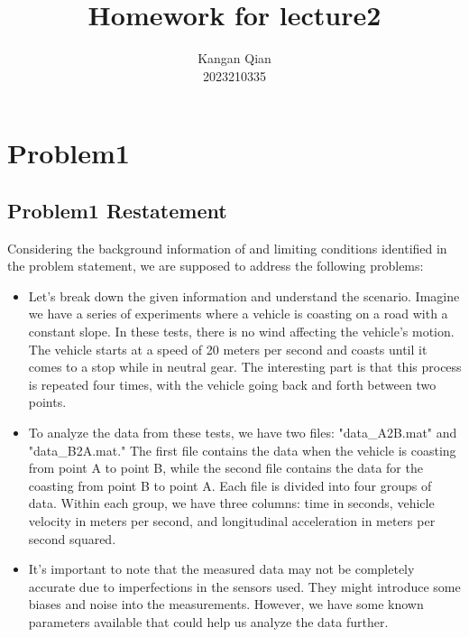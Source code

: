\documentclass[UTF8,a4paper,11pt]{article}
\title{\textbf{\huge{Homework for lecture2}}}
\author{Kangan Qian
\\2023210335}
\date{} %
\begin{document}
\newcommand{\supercite}[1]{\textsuperscript{\cite{#1}}}
\maketitle
\setlength{\oddsidemargin}{ 1cm} %
\setlength{\evensidemargin}{\oddsidemargin}
\setlength{\textwidth}{13.50cm}
\vspace{-0.2cm}

\section{Problem1}
\subsection{Problem1 Restatement}
Considering the background information of and limiting conditions identified in the problem statement, we are supposed to address the following problems:
\begin{itemize}
\item Let's break down the given information and understand the scenario. Imagine we have a series of experiments where a vehicle is coasting on a road with a constant slope. In these tests, there is no wind affecting the vehicle's motion. The vehicle starts at a speed of 20 meters per second and coasts until it comes to a stop while in neutral gear. The interesting part is that this process is repeated four times, with the vehicle going back and forth between two points.
\item
To analyze the data from these tests, we have two files: "data\_A2B.mat" and "data\_B2A.mat." The first file contains the data when the vehicle is coasting from point A to point B, while the second file contains the data for the coasting from point B to point A. Each file is divided into four groups of data. Within each group, we have three columns: time in seconds, vehicle velocity in meters per second, and longitudinal acceleration in meters per second squared.
\item
It's important to note that the measured data may not be completely accurate due to imperfections in the sensors used. They might introduce some biases and noise into the measurements. However, we have some known parameters available that could help us analyze the data further.


\end{itemize}
\end{document}
